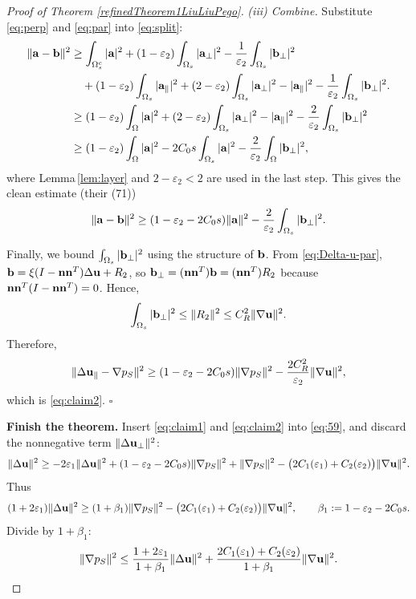\documentclass{article}
\theoremstyle{definition}                   %
\begin{document}
\begin{proof}[Proof of Theorem \ref{refinedTheorem1LiuLiuPego}]
\emph{(iii) Combine.}
Substitute \eqref{eq:perp} and \eqref{eq:par} into \eqref{eq:split}:
\begin{align}
\|{\bf a}-{\bf b}\|^2
&\ge
\int_{\Omega_s^c}|{\bf a}|^2
+(1-\varepsilon_2)\int_{\Omega_s}|{\bf a}_\perp|^2
-\frac{1}{\varepsilon_2}\int_{\Omega_s}|{\bf b}_\perp|^2 \notag\\
& 
\quad + (1-\varepsilon_2) \int_{\Omega_s}|{\bf a}_\parallel|^2 
+(2-\varepsilon_2)\int_{\Omega_s}|{\bf a}_\perp|^2
    -|{\bf a}_{\parallel}|^2
-\frac{1}{\varepsilon_2}\int_{\Omega_s}|{\bf b}_\perp|^2.\notag\\
&\ge 
(1-\varepsilon_2) \int_{\Omega}|{\bf a}|^2
+(2-\varepsilon_2)\int_{\Omega_s}|{\bf a}_\perp|^2
      -|{\bf a}_{\parallel}|^2
-\frac{2}{\varepsilon_2}\int_{\Omega_s}|{\bf b}_\perp|^2 \notag\\
&\ge 
(1-\varepsilon_2) \int_{\Omega}|{\bf a}|^2
-2C_0 s \int_{\Omega_s} |{\bf a}|^2
-\frac{2}{\varepsilon_2}\int_{\Omega}|{\bf b}_\perp|^2,
\label{eq:combine-raw}
\end{align}
where Lemma\,\ref{lem:layer} and $2-\varepsilon_2<2$ are used in the last step.
This gives the
clean estimate (their (71))
\[
\|{\bf a}-{\bf b}\|^2
\ge (1-\varepsilon_2-2C_0 s)\|{\bf a}\|^2
-\frac{2}{\varepsilon_2}\int_{\Omega_s}|{\bf b}_\perp|^2.
\]

Finally, we bound $\int_{\Omega_s}|{\bf b}_\perp|^2$ using the structure of ${\bf b}$.
From \eqref{eq:Delta-u-par}, ${\bf b}=\xi(I-{\bf n}{\bf n}^T)\Delta{\bf u}+R_2$, so
${\bf b}_\perp=({\bf n}{\bf n}^T){\bf b}=({\bf n}{\bf n}^T)R_2$ because
${\bf n}{\bf n}^T(I-{\bf n}{\bf n}^T)=0$. Hence,
\[
\int_{\Omega_s}|{\bf b}_\perp|^2 \le \|R_2\|^2 \le C_R^2\|\nabla{\bf u}\|^2.
\]
Therefore,
\[
\|\Delta{\bf u}_\parallel-\nabla p_S\|^2
\ge (1-\varepsilon_2-2C_0 s)\|\nabla p_S\|^2
-\frac{2C_R^2}{\varepsilon_2}\|\nabla{\bf u}\|^2,
\]
which is \eqref{eq:claim2}. \hfill$\square$

\medskip
\noindent
\textbf{Finish the theorem.}
Insert \eqref{eq:claim1} and \eqref{eq:claim2} into \eqref{eq:59}, and discard the nonnegative term
$\|\Delta{\bf u}_\perp\|^2$:
\[
\|\Delta{\bf u}\|^2
\ge
-2\varepsilon_1\|\Delta{\bf u}\|^2
+(1-\varepsilon_2-2C_0 s)\|\nabla p_S\|^2
+\|\nabla p_S\|^2
-\bigl(2C_1(\varepsilon_1)+C_2(\varepsilon_2)\bigr)\|\nabla{\bf u}\|^2.
\]
Thus
\begin{equation}\label{eq:62}
(1+2\varepsilon_1)\|\Delta{\bf u}\|^2
\ge
(1+\beta_1)\|\nabla p_S\|^2
-\bigl(2C_1(\varepsilon_1)+C_2(\varepsilon_2)\bigr)\|\nabla{\bf u}\|^2,
\qquad
\beta_1:=1-\varepsilon_2-2C_0 s.
\end{equation}
Divide by $1+\beta_1$:
\begin{align}
\|\nabla p_S\|^2
\le
\frac{1+2\varepsilon_1}{1+\beta_1}\|\Delta{\bf u}\|^2
+\frac{2C_1(\varepsilon_1)+C_2(\varepsilon_2)}{1+\beta_1}\|\nabla{\bf u}\|^2.
\label{Liu001}
\end{align}


\end{proof}
\end{document}
